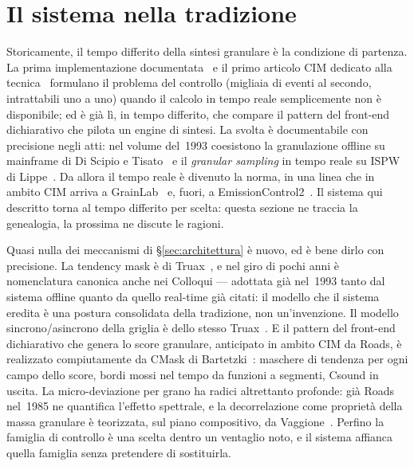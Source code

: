 \section{Il sistema nella tradizione}\label{sec:tradizione}

Storicamente, il tempo differito della sintesi granulare è la condizione di partenza. La prima implementazione
documentata~\cite{Roads1978} e il primo articolo CIM dedicato alla
tecnica~\cite{Roads1985cim} formulano il problema del controllo
(migliaia di eventi al secondo, intrattabili uno a uno) quando il
calcolo in tempo reale semplicemente non è disponibile; ed è già
lì, in tempo differito, che compare il pattern del front-end
dichiarativo che pilota un engine di sintesi. La svolta è
documentabile con precisione negli atti: nel volume del~1993 coesistono
la granulazione offline su mainframe di Di Scipio e
Tisato~\cite{DiScipioTisato1993cim} e il \emph{granular sampling} in
tempo reale su ISPW di Lippe~\cite{Lippe1993cim}. Da allora il tempo reale è divenuto
la norma, in una linea che in ambito CIM arriva a
GrainLab~\cite{Sparano2018} e, fuori, a
EmissionControl2~\cite{Roads2021}. Il sistema qui descritto torna al
tempo differito per scelta: questa sezione ne traccia la genealogia, la
prossima ne discute le ragioni.

Quasi nulla dei meccanismi di \S\ref{sec:architettura} è nuovo, ed è
bene dirlo con precisione. La tendency mask è di
Truax~\cite{Truax1988}, e nel giro di pochi anni è nomenclatura
canonica anche nei Colloqui --- adottata già nel~1993 tanto dal sistema
offline quanto da quello real-time già citati: il modello che il sistema
eredita è una postura consolidata della tradizione, non un'invenzione.
Il modello sincrono/asincrono della griglia è dello stesso
Truax~\cite{Truax1988}. E il pattern del
front-end dichiarativo che genera lo score granulare, anticipato in
ambito CIM da Roads, è realizzato compiutamente da CMask di
Bartetzki~\cite{Bartetzki1997}: maschere di tendenza per ogni campo
dello score, bordi mossi nel tempo da funzioni a segmenti, Csound in
uscita. La
micro-deviazione per grano ha radici altrettanto profonde: già Roads
nel~1985 ne quantifica l'effetto spettrale, e la decorrelazione come
proprietà della massa granulare è teorizzata, sul piano compositivo, da
Vaggione~\cite{Vaggione2002}. Perfino la famiglia di controllo è una
scelta dentro un ventaglio noto, e il sistema affianca quella
famiglia senza pretendere di sostituirla.

